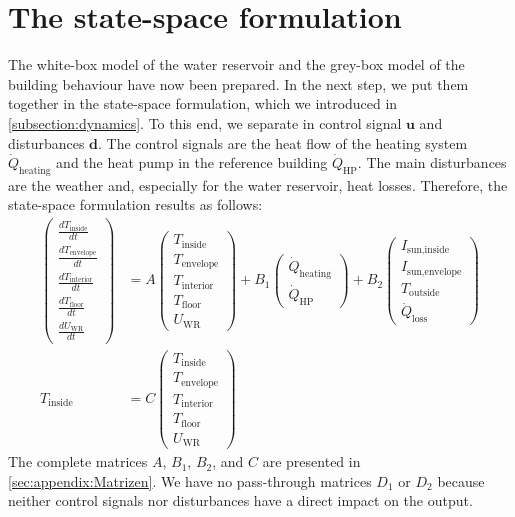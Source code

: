     \section{The state-space formulation}
    \label{holeModel}
    The white-box model of the water reservoir and the grey-box model of the building behaviour have now been prepared. In the next step, we put them together in the state-space formulation, which we introduced in \autoref{subsection:dynamics}.\newline
    To this end, we separate in control signal $\textbf{u}$ and disturbances $\textbf{d}$. The control signals are the heat flow of the heating system $\dot{Q}_\text{heating}$ and the heat pump in the reference building $\dot{Q}_\text{HP}$. The main disturbances are the weather and, especially for the water reservoir, heat losses. Therefore, the state-space formulation results as follows: 
  \begin{align}
	    \label{eq:ZRD Modell}
	 \left(\begin{array}{c} \frac{d T_\text{inside}}{d t} \\ \frac{d T_\text{envelope}}{d t} \\ \frac{d T_\text{interior}}{d t}\\ \frac{d T_\text{floor}}{d t}\\ \frac{d U_\text{WR}}{d t} \end{array}\right) &= A \left(\begin{array}{c} T_\text{inside} \\ T_\text{envelope} \\ T_\text{interior}\\ T_\text{floor}\\ U_\text{WR} \end{array}\right) + B_\text{1} \left(\begin{array}{c} \dot{Q}_\text{heating} \\ \dot{Q}_\text{HP} \end{array}\right) + B_\text{2} \left(\begin{array}{c} I_\text{sun,inside}\\ I_\text{sun,envelope}\\ T_\text{outside} \\ \dot{Q}_\text{loss} \end{array}\right) \\
	 T_\text{inside} &= C \left(\begin{array}{c} T_\text{inside} \\ T_\text{envelope} \\ T_\text{interior}\\ T_\text{floor}\\ U_\text{WR} \end{array}\right) \nonumber
	\end{align}	
    The complete matrices $A$, $B_\text{1}$, $B_\text{2}$, and $C$ are presented in \autoref{sec:appendix:Matrizen}. We have no pass-through matrices $D_\text{1}$ or $D_\text{2}$ because neither control signals nor disturbances have a direct impact on the output. 